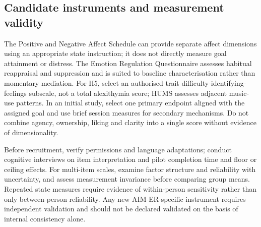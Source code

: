 \subsection{Candidate instruments and measurement validity}
The Positive and Negative Affect Schedule \citep{watson1988} can provide separate affect dimensions using an appropriate state instruction; it does not directly measure goal attainment or distress. The Emotion Regulation Questionnaire \citep{grossjohn2003} assesses habitual reappraisal and suppression and is suited to baseline characterisation rather than momentary mediation. For H5, select an authorised trait difficulty-identifying-feelings subscale, not a total alexithymia score; HUMS assesses adjacent music-use patterns. In an initial study, select one primary endpoint aligned with the assigned goal and use brief session measures for secondary mechanisms. Do not combine agency, ownership, liking and clarity into a single score without evidence of dimensionality.

Before recruitment, verify permissions and language adaptations; conduct cognitive interviews on item interpretation and pilot completion time and floor or ceiling effects. For multi-item scales, examine factor structure and reliability with uncertainty, and assess measurement invariance before comparing group means. Repeated state measures require evidence of within-person sensitivity rather than only between-person reliability. Any new AIM-ER-specific instrument requires independent validation and should not be declared validated on the basis of internal consistency alone.

